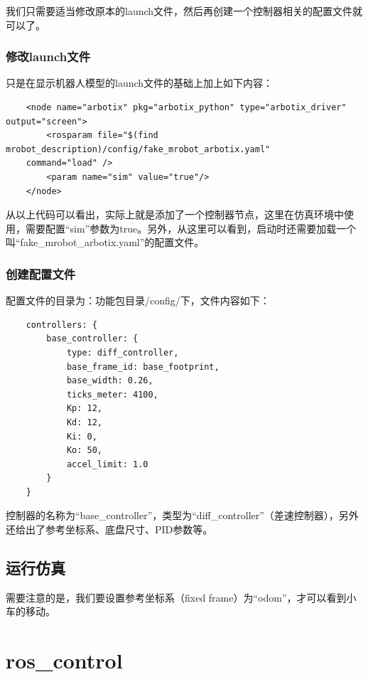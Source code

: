 \documentclass[9pt, oneside]{book}
\begin{document}
我们只需要适当修改原本的launch文件，然后再创建一个控制器相关的配置文件就可以了。

\subsubsection{修改launch文件}

只是在显示机器人模型的launch文件的基础上加上如下内容：

\begin{verbatim}
    <node name="arbotix" pkg="arbotix_python" type="arbotix_driver" output="screen">
        <rosparam file="$(find mrobot_description)/config/fake_mrobot_arbotix.yaml" 
    command="load" />
        <param name="sim" value="true"/>
    </node>
\end{verbatim}

从以上代码可以看出，实际上就是添加了一个控制器节点，这里在仿真环境中使用，需要配置“sim”参数为true。另外，从这里可以看到，启动时还需要加载一个叫“fake\_mrobot\_arbotix.yaml”的配置文件。

\subsubsection{创建配置文件}

配置文件的目录为：功能包目录/config/下，文件内容如下：

\begin{verbatim}
    controllers: {
        base_controller: {
            type: diff_controller, 
            base_frame_id: base_footprint, 
            base_width: 0.26, 
            ticks_meter: 4100, 
            Kp: 12, 
            Kd: 12, 
            Ki: 0, 
            Ko: 50, 
            accel_limit: 1.0 
        }
    }
\end{verbatim}

控制器的名称为“base\_controller”，类型为“diff\_controller”（差速控制器），另外还给出了参考坐标系、底盘尺寸、PID参数等。

\subsection{运行仿真}

需要注意的是，我们要设置参考坐标系（fixed frame）为“odom”，才可以看到小车的移动。

\section{ros\_control}
\end{document}
